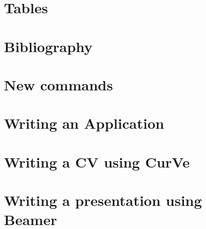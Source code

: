 \section{Tables}

\section{Bibliography}

\section{New commands}

\section{Writing an Application}

\section{Writing a CV using CurVe}

\section{Writing a presentation using Beamer}